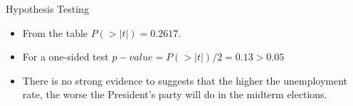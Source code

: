 \documentclass[12pt,a4paper]{beamer}
\begin{document}
				\begin{frame}{Hypothesis Testing}
				\begin{itemize}
				\item From the table $P(>|t|)=0.2617$.\\
				\item For a one-sided test $p-value=P(>|t|)/2=0.13>0.05$
				\item There is no strong evidence to suggests that the higher the unemployment rate, the worse the President's party will do in the midterm elections.
				\end{itemize}
			\end{frame}
\end{document}
